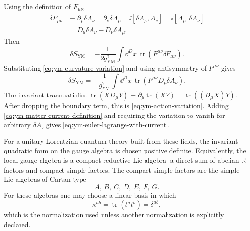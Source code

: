 Using the definition of \(F_{\mu\nu}\),
\[
\begin{aligned}
  \delta F_{\mu\nu}
  &=
  \partial_\mu\delta A_\nu-\partial_\nu\delta A_\mu
  -\ii[\delta A_\mu,A_\nu]-\ii[A_\mu,\delta A_\nu]  \\
  &=
  D_\mu\delta A_\nu-D_\nu\delta A_\mu .
\end{aligned}
\]
Then
\[
  \delta S_{\mathrm{YM}}
  =
  -\frac1{2g_{\mathrm{YM}}^2}
  \int\dd^Dx\,
  \operatorname{tr}(F^{\mu\nu}\delta F_{\mu\nu}).
\]
Substituting \eqref{eq:ym-curvature-variation} and using antisymmetry of
\(F^{\mu\nu}\) gives
\[
  \delta S_{\mathrm{YM}}
  =
  -\frac1{g_{\mathrm{YM}}^2}
  \int\dd^Dx\,
  \operatorname{tr}(F^{\mu\nu}D_\mu\delta A_\nu).
\]
The invariant trace satisfies
\(\operatorname{tr}(X D_\mu Y)=\partial_\mu\operatorname{tr}(XY)
-\operatorname{tr}((D_\mu X)Y)\).  After dropping the boundary term, this is
\eqref{eq:ym-action-variation}.  Adding
\eqref{eq:ym-matter-current-definition} and requiring the variation to vanish
for arbitrary \(\delta A_\nu\) gives
\eqref{eq:ym-euler-lagrange-with-current}.

For a unitary Lorentzian quantum theory built from these fields, the invariant
quadratic form on the gauge algebra is chosen positive definite.  Equivalently,
the local gauge algebra is a compact reductive Lie algebra: a direct sum of
abelian \(\mathbb R\) factors and compact simple factors.  The compact simple
factors are the simple Lie algebras of Cartan type
\[
  A,\ B,\ C,\ D,\ E,\ F,\ G .
\]
For these algebras one may choose a linear basis in which
\[
  \kappa^{ab}=\operatorname{tr}(t^a t^b)=\delta^{ab},
\]
which is the normalization used unless another normalization is explicitly
declared.

